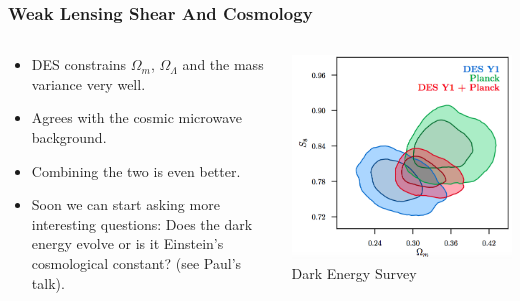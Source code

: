 \documentclass{beamer}
\begin{document}
{\begin{columns}
    \end{columns}


}

\frame
{

    \frametitle{Weak Lensing Shear And Cosmology}


    \begin{columns}
        \begin{column}{0.5\textwidth}
            \begin{itemize}

                \item DES constrains {\color{gold} $\Omega_m$}, {\color{gold} $\Omega_\Lambda$}
                    and the mass variance very well.

                \item Agrees with the cosmic microwave background.
                    
                \item Combining the two is even better.

                \item Soon we can start asking more interesting questions: Does the
                    dark energy evolve or is it Einstein's cosmological constant? (see
                    Paul's talk).

            \end{itemize}

        \end{column}
        \begin{column}{0.5\textwidth}
            \begin{center}
                \includegraphics[width=\textwidth]{3x2-fig10.png}
                \newline
                {\tiny Dark Energy Survey}
            \end{center}
        \end{column}

    \end{columns}


}
\end{document}
